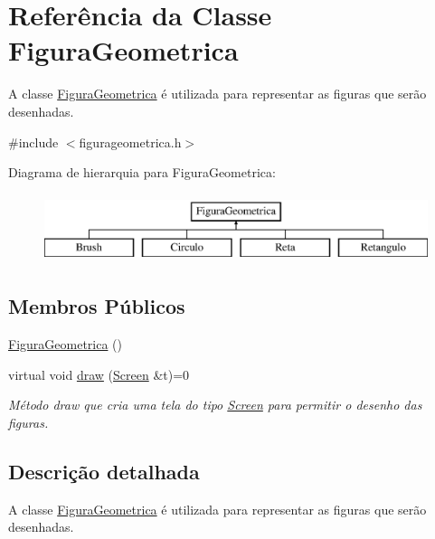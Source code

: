\hypertarget{class_figura_geometrica}{}\section{Referência da Classe Figura\+Geometrica}
\label{class_figura_geometrica}


A classe \mbox{\hyperlink{class_figura_geometrica}{Figura\+Geometrica}} é utilizada para representar as figuras que serão desenhadas.  




{\ttfamily \#include $<$figurageometrica.\+h$>$}

Diagrama de hierarquia para Figura\+Geometrica\+:\begin{figure}[H]
\begin{center}
\leavevmode
\includegraphics[height=2.000000cm]{class_figura_geometrica}
\end{center}
\end{figure}
\subsection*{Membros Públicos}
\begin{DoxyCompactItemize}
\item 
\mbox{\hyperlink{class_figura_geometrica_a81d7c7efaea511e60a15f5a363138dd9}{Figura\+Geometrica}} ()
\item 
virtual void \mbox{\hyperlink{class_figura_geometrica_a8ee8dedc060b6059a805ea091aef2c41}{draw}} (\mbox{\hyperlink{class_screen}{Screen}} \&t)=0
\begin{DoxyCompactList}\small\item\em Método draw que cria uma tela do tipo \mbox{\hyperlink{class_screen}{Screen}} para permitir o desenho das figuras. \end{DoxyCompactList}\end{DoxyCompactItemize}


\subsection{Descrição detalhada}
A classe \mbox{\hyperlink{class_figura_geometrica}{Figura\+Geometrica}} é utilizada para representar as figuras que serão desenhadas. 

